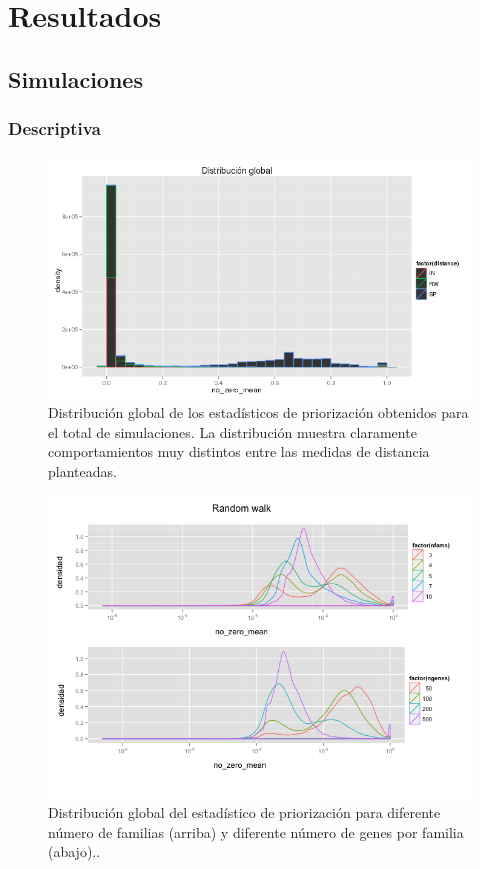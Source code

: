 \chapter{Resultados}

\section{Simulaciones}

\subsection{Descriptiva}


\begin{figure}[H]
\centering
\includegraphics[scale=0.45]{images/emp_tabla_global.png} 
\caption{Distribución global de los estadísticos de priorización obtenidos para el total de simulaciones. La distribución muestra claramente comportamientos muy distintos entre las medidas de distancia planteadas.}
\label{fig:emp_global}
\end{figure}

\medskip
\medskip

\begin{figure}[H]
\centering
\includegraphics[scale=0.45]{images/emp_rw_nfams_ngenes.png} 
\caption{Distribución global del estadístico de priorización para diferente número de familias (arriba) y diferente número de genes por familia (abajo)..}
\label{fig:emp_rw_nfams_ngenes}
\end{figure}

